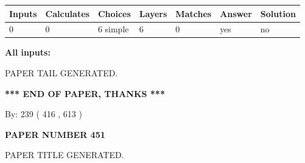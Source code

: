 \documentclass{ctexart}
\begin{document}
 
   
   
   
   
\noindent\begin{tabular}{|l|l|l|l|l|l|l|}
 \hline
Inputs & Calculates & Choices & Layers & Matches & Answer & Solution \\ \hline
 0  & 
 0  & 
 6
  simple  
  & 
 6  & 
 0  & 
  yes & 
  no 
  \\ \hline
 \end{tabular}
   
   
   
   
\noindent{}
   
   
   
   
\noindent\vspace{0.1in}\hspace{-0.08in} {\textbf{\Large{All inputs: }}}
   
   
   
   
   
   
 \vspace{0.2in}
 
   
   
\vspace{2.0in} PAPER TAIL GENERATED.
   
   
   
   
\vspace{1.0in} 
{\textbf{\large{ *** END OF PAPER, THANKS *** }}} 
   
   
\hspace{1.0in} By: 
 239 ( 416 ,  613 )
   
   
   
   
\newpage 
\setcounter{page}{ 
   451001 } 
   
   
   
   
 {\textbf{ \Large{ PAPER NUMBER  451  }}}
   
   
\vspace{0.2in}
   
   
   
   
   
   
   
   
 \vspace{0.2in}
 
 
 
 
   
   
 PAPER TITLE GENERATED.
   
\end{document}
